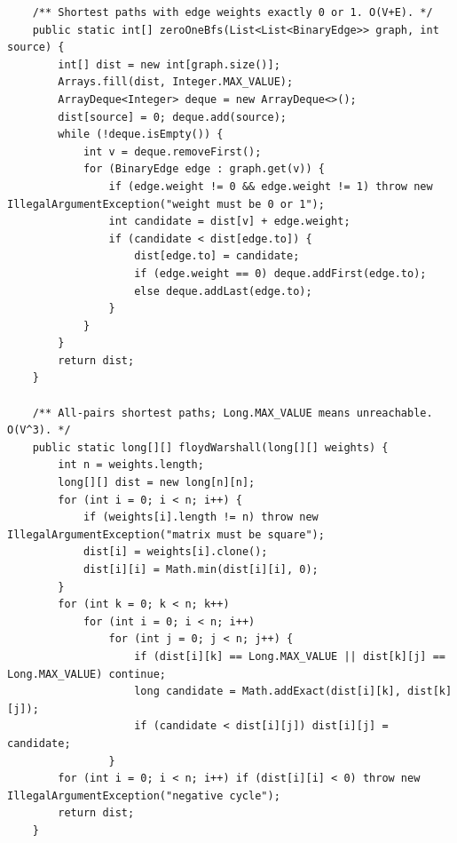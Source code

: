 \documentclass[10pt,letterpaper]{article}
\begin{document}
\begin{lstlisting}
    /** Shortest paths with edge weights exactly 0 or 1. O(V+E). */
    public static int[] zeroOneBfs(List<List<BinaryEdge>> graph, int source) {
        int[] dist = new int[graph.size()];
        Arrays.fill(dist, Integer.MAX_VALUE);
        ArrayDeque<Integer> deque = new ArrayDeque<>();
        dist[source] = 0; deque.add(source);
        while (!deque.isEmpty()) {
            int v = deque.removeFirst();
            for (BinaryEdge edge : graph.get(v)) {
                if (edge.weight != 0 && edge.weight != 1) throw new IllegalArgumentException("weight must be 0 or 1");
                int candidate = dist[v] + edge.weight;
                if (candidate < dist[edge.to]) {
                    dist[edge.to] = candidate;
                    if (edge.weight == 0) deque.addFirst(edge.to);
                    else deque.addLast(edge.to);
                }
            }
        }
        return dist;
    }

    /** All-pairs shortest paths; Long.MAX_VALUE means unreachable. O(V^3). */
    public static long[][] floydWarshall(long[][] weights) {
        int n = weights.length;
        long[][] dist = new long[n][n];
        for (int i = 0; i < n; i++) {
            if (weights[i].length != n) throw new IllegalArgumentException("matrix must be square");
            dist[i] = weights[i].clone();
            dist[i][i] = Math.min(dist[i][i], 0);
        }
        for (int k = 0; k < n; k++)
            for (int i = 0; i < n; i++)
                for (int j = 0; j < n; j++) {
                    if (dist[i][k] == Long.MAX_VALUE || dist[k][j] == Long.MAX_VALUE) continue;
                    long candidate = Math.addExact(dist[i][k], dist[k][j]);
                    if (candidate < dist[i][j]) dist[i][j] = candidate;
                }
        for (int i = 0; i < n; i++) if (dist[i][i] < 0) throw new IllegalArgumentException("negative cycle");
        return dist;
    }


\end{lstlisting}
\end{document}
